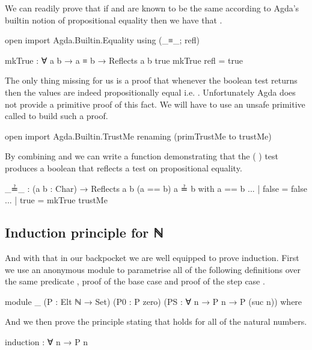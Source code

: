 \documentclass[twocolumn]{article}
\begin{document}
We can readily prove that if  and  are known to be the same
according to Agda's builtin notion of propositional equality then we have
that {   }.

\begin{code}
open import Agda.Builtin.Equality using (_≡_; refl)

mkTrue : ∀ {a b} → a ≡ b → Reflects a b true
mkTrue refl = true
\end{code}

The only thing missing for us is a proof that whenever the boolean test
{ \AF{==} } returns  then the values are indeed
propositionally equal i.e. {  }.
Unfortunately Agda does not provide a primitive proof of this fact.
We will have to use an unsafe primitive called  to build
such a proof.

\begin{code}
open import Agda.Builtin.TrustMe
  renaming (primTrustMe to trustMe)
\end{code}

By combining  and  we can write a function demonstrating
that the {( \AF{==} )} test produces a boolean that reflects a test
on propositional equality.

\begin{code}
_≟_ : (a b : Char) → Reflects a b (a == b)
a ≟ b with a == b
... | false = false
... | true = mkTrue trustMe
\end{code}

\subsection{Induction principle for ℕ}

And with that in our backpocket we are well equipped to prove induction.
First we use an anonymous module to parametrise all of the following definitions
over the same predicate , proof of the base case  and proof of the
step case .

\begin{code}
module _ (P : Elt ℕ → Set)
         (P0 : P zero)
         (PS : ∀ n → P n → P (suc n))
         where
\end{code}

And we then prove the  principle stating that  holds for
all of the natural numbers.

\begin{code}
  induction : ∀ n → P n
\end{code}
\end{document}

